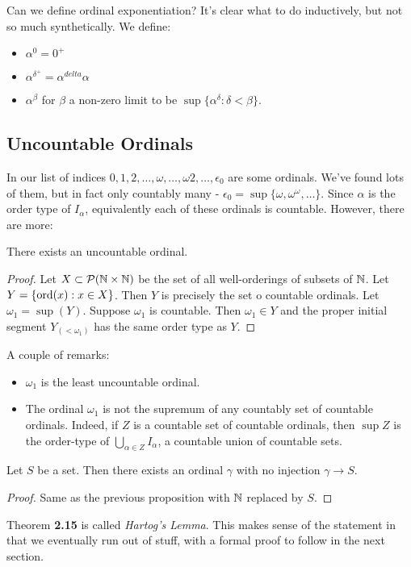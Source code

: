 \documentclass[10pt,a4paper]{article}
\begin{document}
Can we define ordinal exponentiation? It's clear what to do inductively, but not so much synthetically. We define:
\begin{itemize}
\item $\alpha^0 = 0^+$
\item $\alpha^{\delta^+} = \alpha^{delta}\alpha$
\item $\alpha^{\beta}$ for $\beta$ a non-zero limit to be $\sup\{\alpha^\delta: \delta<\beta\}$.
\end{itemize}

\subsection{Uncountable Ordinals}
In \textbf{} our list of indices $0,1,2,\ldots, \omega,\ldots, \omega 2, \ldots, \epsilon_0$ are some ordinals. We've found lots of them, but in fact only countably many - $\epsilon_0 = \sup\{\omega, \omega^{\omega},\ldots\}$. Since $\alpha$ is the order type of $I_{\alpha}$, equivalently each of these ordinals is countable. However, there are more:
\begin{proposition}
There exists an uncountable ordinal.
\end{proposition}
\begin{proof}
Let $X \subset \mathcal{P}(\mathbb{N} \times \mathbb{N})$ be the set of all well-orderings of subsets of $\mathbb{N}$. Let $Y = \{\operatorname{ord}(x)  : x \in X\}$. Then $Y$ is precisely the set o countable ordinals. Let $\omega_1 = \sup(Y)$. Suppose $\omega_1$ is countable. Then $\omega_1 \in Y$ and the proper initial segment $Y_{(<\omega_1)}$ has the same order type as $Y$. \contr
\end{proof}
A couple of remarks:
\begin{itemize}
\item $\omega_1$ is the least uncountable ordinal.
\item The ordinal $\omega_1$ is not the supremum of any countably set of countable ordinals. Indeed, if $Z$ is a countable set of countable ordinals, then $\sup Z$ is the order-type of $\bigcup_{\alpha \in Z}I_{\alpha}$, a countable union of countable sets.
\end{itemize}
\begin{theorem}
Let $S$ be a set. Then there exists an ordinal $\gamma$ with no injection $\gamma \to S$.
\end{theorem}
\begin{proof}
Same as the previous proposition with $\mathbb{N}$ replaced by $S$.
\end{proof}
Theorem \textbf{2.15} is called \emph{Hartog's Lemma}. This makes sense of the statement in \textbf{} that we eventually run out of stuff, with a formal proof to follow in the next section.
\end{document}
